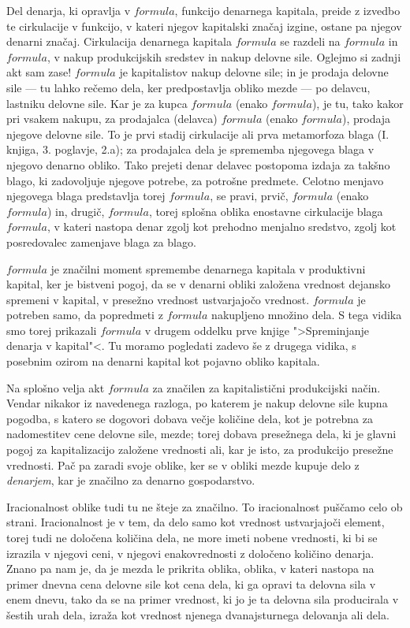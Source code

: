 \documentclass[kapital_02.tex]{subfiles}
\begin{document}
Del denarja, ki opravlja v \( formula \), funkcijo denarnega kapitala, preide z izvedbo te cirkulacije v funkcijo, v kateri njegov kapitalski značaj izgine, ostane pa njegov denarni značaj. Cirkulacija denarnega kapitala \( formula \) se razdeli na \( formula \) in \( formula \), v nakup produkcijskih sredstev in nakup delovne sile. Oglejmo si zadnji akt sam zase! \( formula \) je kapitalistov nakup delovne sile; in je prodaja delovne sile --- tu lahko rečemo dela, ker predpostavlja obliko mezde --- po delavcu, lastniku delovne sile. Kar je za kupca \( formula \) (enako \( formula \)), je tu, tako kakor pri vsakem nakupu, za prodajalca (delavca) \( formula \) (enako \( formula \)), prodaja njegove delovne sile. To je prvi stadij cirkulacije ali prva metamorfoza blaga (I. knjiga, 3. poglavje, 2.a); za prodajalca dela je sprememba njegovega blaga v njegovo denarno obliko. Tako prejeti denar delavec postopoma izdaja za takšno blago, ki zadovoljuje njegove potrebe, za potrošne predmete. Celotno menjavo njegovega blaga predstavlja torej \( formula \), se pravi, prvič, \( formula \) (enako \( formula \)) in, drugič, \( formula \), torej splošna oblika enostavne cirkulacije blaga \( formula \), v kateri nastopa denar zgolj kot prehodno menjalno sredstvo, zgolj kot posredovalec zamenjave blaga za blago.

\( formula \) je značilni moment spremembe denarnega kapitala v produktivni kapital, ker je bistveni pogoj, da se v denarni obliki založena vrednost dejansko spremeni v kapital, v presežno vrednost ustvarjajočo vrednost. \( formula \) je potreben samo, da popredmeti z \( formula \) nakupljeno množino dela. S tega vidika smo torej prikazali \( formula \) v drugem oddelku prve knjige ">Spreminjanje denarja v kapital"<. Tu moramo pogledati zadevo še z drugega vidika, s posebnim ozirom na denarni kapital kot pojavno obliko kapitala.

Na splošno velja akt \( formula \) za značilen za kapitalistični produkcijski način. Vendar nikakor iz navedenega razloga, po katerem je nakup delovne sile kupna pogodba, s katero se dogovori dobava večje količine dela, kot je potrebna za nadomestitev cene delovne sile, mezde; torej dobava presežnega dela, ki je glavni pogoj za kapitalizacijo založene vrednosti ali, kar je isto, za produkcijo presežne vrednosti. Pač pa zaradi svoje oblike, ker se v obliki mezde kupuje delo z \emph{denarjem}, kar je značilno za denarno gospodarstvo.

Iracionalnost oblike tudi tu ne šteje za značilno. To iracionalnost puščamo celo ob strani. Iracionalnost je v tem, da delo samo kot vrednost ustvarjajoči element, torej tudi ne določena količina dela, ne more imeti nobene vrednosti, ki bi se izrazila v njegovi ceni, v njegovi enakovrednosti z določeno količino denarja. Znano pa nam je, da je mezda le prikrita oblika, oblika, v kateri nastopa na primer dnevna cena delovne sile kot cena dela, ki ga opravi ta delovna sila v enem dnevu, tako da se na primer vrednost, ki jo je ta delovna sila producirala v šestih urah dela, izraža kot vrednost njenega dvanajsturnega delovanja ali dela.
\end{document}
